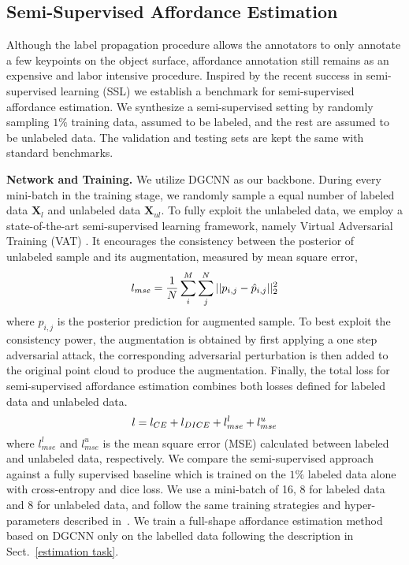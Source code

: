 \documentclass[final]{cvpr}
\newcommand{\matr}[1]{\mathbf{#1}}
\begin{document}
\subsection{Semi-Supervised Affordance Estimation}

Although the label propagation procedure allows the annotators to only annotate a few keypoints on the object surface, affordance annotation still remains as an expensive and labor intensive procedure. Inspired by the recent success in semi-supervised learning (SSL) \cite{laine2016temporal,tarvainen2017mean,miyato2018virtual} we establish a benchmark for semi-supervised affordance estimation. We synthesize a semi-supervised setting by randomly sampling $1\%$ training data, assumed to be labeled, and the rest are assumed to be unlabeled data. The validation and testing sets are kept the same with standard benchmarks. 

\noindent\textbf{Network and Training.} We utilize DGCNN\cite{wang2019dynamic} as our backbone. During every mini-batch in the training stage, we randomly sample a equal number of labeled data $\matr{X}_{l}$ and unlabeled data $\matr{X}_{ul}$. To fully exploit the unlabeled data, we employ a state-of-the-art semi-supervised learning framework, namely Virtual Adversarial Training (VAT) \cite{miyato2018virtual}. It encourages the consistency between the posterior of unlabeled sample and its augmentation, measured by mean square error,
\vspace{-0.3cm}
\begin{equation}
l_{mse}=\frac{1}{N}\sum_{i}^{M}\sum_{j}^{N}||p_{i,j}-\hat{p}_{i,j}||_2^2
\vspace{-0.2cm}
\end{equation}
where $\hat{p}_{i,j}$ is the posterior prediction for augmented sample. To best exploit the consistency power, the augmentation is obtained by first applying a one step adversarial attack, the corresponding adversarial perturbation is then added to the original point cloud to produce the augmentation. Finally, the total loss for semi-supervised affordance estimation combines both losses defined for labeled data and unlabeled data.
\vspace{-0.1cm}
\begin{equation}
   l = l_{CE} + l_{DICE} + l_{mse}^l + l_{mse}^u
   \vspace{-0.2cm}
\end{equation}
where $l_{mse}^l$ and $l_{mse}^u$ is the mean square error (MSE) calculated between labeled and unlabeled data, respectively. We compare the semi-supervised approach against a fully supervised baseline which is trained on the $1\%$ labeled data alone with cross-entropy and dice loss.
We use a mini-batch of 16, 8 for labeled data and 8 for unlabeled data, and follow the same training strategies and hyper-parameters described in~\cite{miyato2018virtual}. We train a full-shape affordance estimation method based on DGCNN only on the labelled data following the description in Sect.~\ref{estimation task}.
\end{document}
